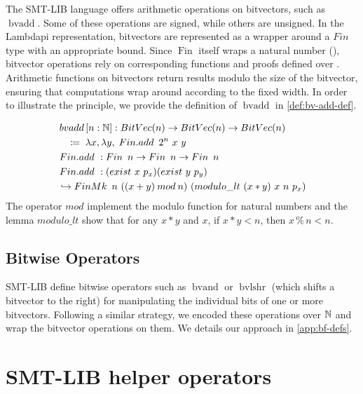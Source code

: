 The SMT-LIB language offers arithmetic operations on bitvectors, such as $\mathop{bvadd}$. 
Some of these operations are signed, while others are unsigned. In the Lambdapi representation, bitvectors are represented as a wrapper around a $Fin$ type with an appropriate bound.
Since $\mathop{Fin}$ itself wraps a natural number (\N), bitvector operations rely on corresponding functions and proofs defined over \N.
Arithmetic functions on bitvectors return results modulo the size of the bitvector, ensuring that computations wrap around according to the fixed width.
In order to illustrate the principle, we provide the definition of $\mathop{bvadd}$ in \cref{def:bv-add-def}.

\begin{definition}\label{def:bv-add-def}
\begin{align*}
&\mathop{bvadd}\,[n : \mathbb{N}] : \mathop{BitVec}(n) \rightarrow \mathop{BitVec}(n) \rightarrow \mathop{BitVec}(n) \\
&\quad\coloneq\; \lambda x, \lambda y, \; \mathop{Fin.add}~2^n~x~y \\
&\mathop{Fin.add}~: \mathop{Fin}~n \rightarrow \mathop{Fin}~n \rightarrow \mathop{Fin}~n \\
&\mathop{Fin.add}~: (\mathbin{exist}~x~p_x) (\mathbin{exist}~y~p_y) \\
&\hookrightarrow \mathop{FinMk}~n~((x + y) \mathbin{mod} n)~(modulo\_lt~(x * y)~x~n~p_x)
\end{align*}
The operator $\mathbin{mod}$ implement the modulo function for natural numbers and the lemma $modulo\_lt$
show that for any $x * y$ and $x$, if $x * y < n$, then $x \mathbin{\%} n < n$.
\end{definition}


\subsection{Bitwise Operators}

SMT-LIB define bitwise operators such as $\mathop{bvand}$ or $\mathop{bvlshr}$  (which shifts a bitvector to the right) for manipulating the individual bits of one or more bitvectors. 
Following a similar strategy, we encoded these operations over $\mathbb{N}$ and wrap the bitvector operations on them. We details our approach in \cref{app:bf-defs}.

\section{SMT-LIB helper operators}
\label{sec:encoding-helper-operator}

